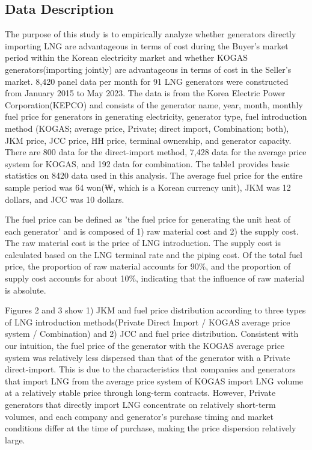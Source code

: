 \documentclass[12pt]{article}
\begin{document}
\subsection{Data Description}
The purpose of this study is to empirically analyze whether generators directly importing LNG are advantageous in terms of cost during the Buyer's market period within the Korean electricity market and whether KOGAS generators(importing jointly) are advantageous in terms of cost in the Seller's market. 8,420 panel data per month for 91 LNG generators were constructed from January 2015 to May 2023. The data is from the Korea Electric Power Corporation(KEPCO) and consists of the generator name, year, month, monthly fuel price for generators in generating electricity, generator type, fuel introduction method (KOGAS; average price, Private; direct import, Combination; both), JKM price, JCC price, HH price, terminal ownership, and generator capacity. There are 800 data for the direct-import method, 7,428 data for the average price system for KOGAS, and 192 data for combination. The table1 provides basic statistics on 8420 data used in this analysis. The average fuel price for the entire sample period was 64 won(₩, which is a Korean currency unit), JKM was 12 dollars, and JCC was 10 dollars.



The fuel price can be defined as 'the fuel price for generating the unit heat of each generator' and is composed of 1) raw material cost and 2) the supply cost. The raw material cost is the price of LNG introduction. The supply cost is calculated based on the LNG terminal rate and the piping cost. Of the total fuel price, the proportion of raw material accounts for 90\%, and the proportion of supply cost accounts for about 10\%, indicating that the influence of raw material is absolute.

Figures 2 and 3 show 1) JKM and fuel price distribution according to three types of LNG introduction methods(Private Direct Import / KOGAS average price system / Combination) and 2) JCC and fuel price distribution. Consistent with our intuition, the fuel price of the generator with the KOGAS average price system was relatively less dispersed than that of the generator with a Private direct-import.
This is due to the characteristics that companies and generators that import LNG from the average price system of KOGAS import LNG volume at a relatively stable price through long-term contracts. However, Private generators that directly import LNG concentrate on relatively short-term volumes, and each company and generator's purchase timing and market conditions differ at the time of purchase, making the price dispersion relatively large.
\end{document}
